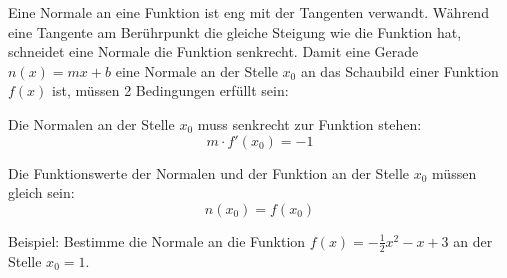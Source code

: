 Eine Normale an eine Funktion ist eng mit der Tangenten verwandt. Während eine Tangente am Berührpunkt die gleiche Steigung wie die Funktion hat, schneidet eine Normale die Funktion senkrecht. Damit eine Gerade \(n(x)=mx+b\) eine Normale an der Stelle \(x_0\) an das Schaubild einer Funktion \(f(x)\) ist, müssen 2 Bedingungen erfüllt sein:

\iftoggle{qrcode}{\setlength{\qrheight}{2.5cm}}{\setlength{\qrheight}{0cm}}%
\begin{minipage}{\linewidth}
    \begin{minipage}{\linewidth-\qrheight}
    \begin{tcolorbox}[width=\linewidth]

        \bigskip

	   \textcolor{loestc}{Die Normalen an der Stelle \(x_0\) muss senkrecht zur Funktion stehen:
		\[m\cdot f'(x_0)=-1\]}
    \end{tcolorbox}%
    \end{minipage}%
    \iftoggle{qrcode}{\begin{minipage}{\qrheight}
        \href{https://www.geogebra.org/m/faavja2d}{\texttt{[image: \\ableitung/pics/NormalenQR.png]}}%
    \end{minipage}}{}%
\end{minipage}%
\begin{tcolorbox}

    \bigskip

	\textcolor{loestc}{Die Funktionswerte der Normalen und der Funktion an der Stelle \(x_0\) müssen gleich sein:
		\[n(x_0)=f(x_0)\]}
\end{tcolorbox}
Beispiel: Bestimme die Normale an die Funktion \(f(x)=-\frac{1}{2}x^2-x+3\) an der Stelle \(x_0=1\).\vspace{0.5cm}

